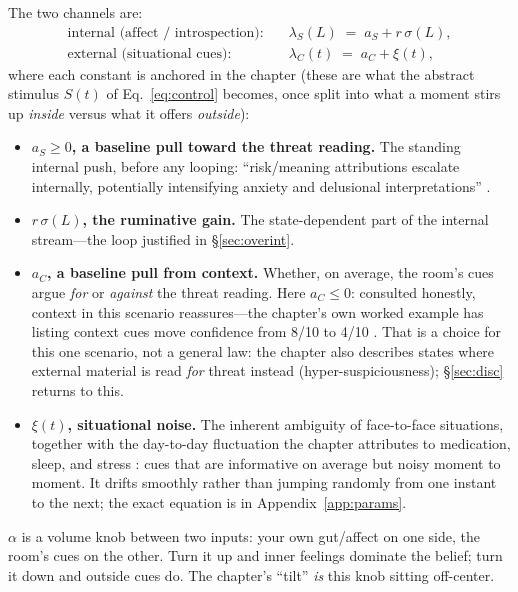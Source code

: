\documentclass[11pt]{article}
\newcommand{\sig}{\sigma}
\begin{document}
\noindent The two channels are:
\begin{align}
\text{internal (affect / introspection):}\quad & \lambda_S(L) \;=\; a_S + r\,\sig(L),\\
\text{external (situational cues):}\quad & \lambda_C(t) \;=\; a_C + \xi(t),
\end{align}
where each constant is anchored in the chapter (these are what the abstract stimulus $S(t)$ of Eq.~\eqref{eq:control} becomes, once split into what a moment stirs up \emph{inside} versus what it offers \emph{outside}):
\begin{itemize}[leftmargin=1.5em]
\item \textbf{$a_S\ge0$, a baseline pull toward the threat reading.} The standing internal push, before any looping: ``risk/meaning attributions escalate internally, potentially intensifying anxiety and delusional interpretations'' \citep[p.~5]{HanEtAL2025}.
\item \textbf{$r\,\sig(L)$, the ruminative gain.} The state-dependent part of the internal stream---the loop justified in \S\ref{sec:overint}.
\item \textbf{$a_C$, a baseline pull from context.} Whether, on average, the room's cues argue \emph{for} or \emph{against} the threat reading. Here $a_C\le0$: consulted honestly, context in this scenario reassures---the chapter's own worked example has listing context cues move confidence from 8/10 to 4/10 \citep[Box~2, p.~12]{HanEtAL2025}. That is a choice for this one scenario, not a general law: the chapter also describes states where external material is read \emph{for} threat instead (hyper-suspiciousness); \S\ref{sec:disc} returns to this.
\item \textbf{$\xi(t)$, situational noise.} The inherent ambiguity of face-to-face situations, together with the day-to-day fluctuation the chapter attributes to medication, sleep, and stress \citep[p.~5]{HanEtAL2025}: cues that are informative on average but noisy moment to moment. It drifts smoothly rather than jumping randomly from one instant to the next; the exact equation is in Appendix~\ref{app:params}.
\end{itemize}

\begin{plainbox}
$\alpha$ is a volume knob between two inputs: your own gut/affect on one side, the room's cues on the other. Turn it up and inner feelings dominate the belief; turn it down and outside cues do. The chapter's ``tilt'' \emph{is} this knob sitting off-center.
\end{plainbox}
\end{document}
